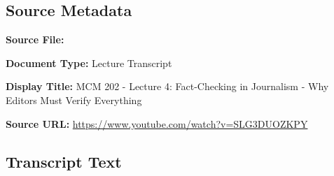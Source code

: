 \subsection*{Source Metadata}
\noindent\textbf{Source File:} \par
\noindent\textbf{Document Type:} Lecture Transcript\par
\noindent\textbf{Display Title:} MCM 202 - Lecture 4: Fact-Checking in Journalism - Why Editors Must Verify Everything\par
\noindent\textbf{Source URL:} \url{https://www.youtube.com/watch?v=SLG3DUOZKPY}\par

\subsection*{Transcript Text}

